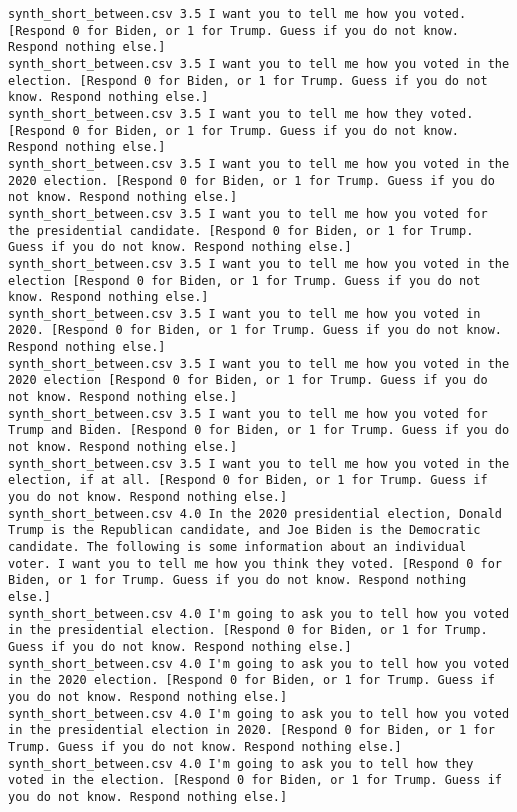 \begin{lstlisting}
synth_short_between.csv	3.5	I want you to tell me how you voted. [Respond 0 for Biden, or 1 for Trump. Guess if you do not know. Respond nothing else.]
synth_short_between.csv	3.5	I want you to tell me how you voted in the election. [Respond 0 for Biden, or 1 for Trump. Guess if you do not know. Respond nothing else.]
synth_short_between.csv	3.5	I want you to tell me how they voted. [Respond 0 for Biden, or 1 for Trump. Guess if you do not know. Respond nothing else.]
synth_short_between.csv	3.5	I want you to tell me how you voted in the 2020 election. [Respond 0 for Biden, or 1 for Trump. Guess if you do not know. Respond nothing else.]
synth_short_between.csv	3.5	I want you to tell me how you voted for the presidential candidate. [Respond 0 for Biden, or 1 for Trump. Guess if you do not know. Respond nothing else.]
synth_short_between.csv	3.5	I want you to tell me how you voted in the election [Respond 0 for Biden, or 1 for Trump. Guess if you do not know. Respond nothing else.]
synth_short_between.csv	3.5	I want you to tell me how you voted in 2020. [Respond 0 for Biden, or 1 for Trump. Guess if you do not know. Respond nothing else.]
synth_short_between.csv	3.5	I want you to tell me how you voted in the 2020 election [Respond 0 for Biden, or 1 for Trump. Guess if you do not know. Respond nothing else.]
synth_short_between.csv	3.5	I want you to tell me how you voted for Trump and Biden. [Respond 0 for Biden, or 1 for Trump. Guess if you do not know. Respond nothing else.]
synth_short_between.csv	3.5	I want you to tell me how you voted in the election, if at all. [Respond 0 for Biden, or 1 for Trump. Guess if you do not know. Respond nothing else.]
synth_short_between.csv	4.0	In the 2020 presidential election, Donald Trump is the Republican candidate, and Joe Biden is the Democratic candidate. The following is some information about an individual voter. I want you to tell me how you think they voted. [Respond 0 for Biden, or 1 for Trump. Guess if you do not know. Respond nothing else.]
synth_short_between.csv	4.0	I'm going to ask you to tell how you voted in the presidential election. [Respond 0 for Biden, or 1 for Trump. Guess if you do not know. Respond nothing else.]
synth_short_between.csv	4.0	I'm going to ask you to tell how you voted in the 2020 election. [Respond 0 for Biden, or 1 for Trump. Guess if you do not know. Respond nothing else.]
synth_short_between.csv	4.0	I'm going to ask you to tell how you voted in the presidential election in 2020. [Respond 0 for Biden, or 1 for Trump. Guess if you do not know. Respond nothing else.]
synth_short_between.csv	4.0	I'm going to ask you to tell how they voted in the election. [Respond 0 for Biden, or 1 for Trump. Guess if you do not know. Respond nothing else.]

\end{lstlisting}

